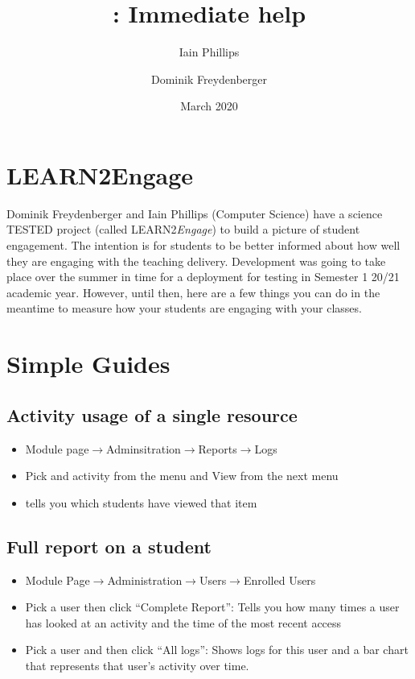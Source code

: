 \documentclass{lucs-art}
\title{\ltoe: Immediate help}
\author{Iain Phillips\and Dominik Freydenberger}
\date{March 2020}
\newcommand{\ltoe}{LEARN{\kern 1pt}2\emph{Engage}\xspace}
\begin{document}
\maketitle

\section{LEARN2Engage}\label{learn2engage}

Dominik Freydenberger and Iain Phillips (Computer Science) have a
science TESTED project (called \ltoe) to build a picture of student
engagement. The intention is for students to be better informed about
how well they are engaging with the teaching delivery. Development was
going to take place over the summer in time for a deployment for testing
in Semester 1 20/21 academic year. However, until then, here are a few
things you can do in the meantime to measure how your students are
engaging with your classes.

\section{Simple Guides}\label{simple-guides}

\subsection{Activity usage of a single
resource}\label{activity-usage-of-a-single-resource}

\begin{itemize}
\item
  Module
  page$\rightarrow$Adminsitration$\rightarrow$Reports$\rightarrow$Logs
\item
  Pick and activity from the menu and View from the next menu
\item
  tells you which students have viewed that item
\end{itemize}

\subsection{Full report on a student}\label{full-report-on-a-student}

\begin{itemize}
\item
  Module Page$\rightarrow$Administration$\rightarrow$Users$\rightarrow$Enrolled Users
\item
  Pick a user then click ``Complete Report'': Tells you how many times a
  user has looked at an activity and the time of the most recent access
\item
  Pick a user and then click ``All logs'': Shows logs for this user and
  a bar chart that represents that user's activity over time.
\end{itemize}
\end{document}
